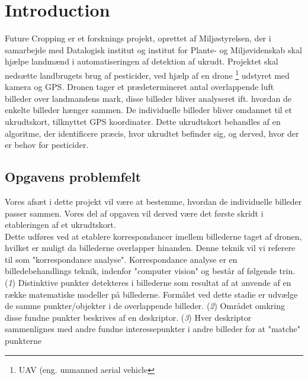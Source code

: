 \chapter{Introduction} \label{sec:intro}
Future Cropping er et forsknings projekt, oprettet af Miljøstyrelsen, der i samarbejde med Datalogisk institut og institut for Plante- og Miljøvidenskab skal hjælpe landmænd i automatiseringen af detektion af ukrudt. Projektet skal nedsætte landbrugets brug af pesticider, ved hjælp af en drone \footnote{UAV (eng. unmanned aerial vehicle} udstyret med kamera og GPS. Dronen tager et prædetermineret antal overlappende luft billeder over landmandens mark, disse billeder bliver analyseret ift. hvordan de enkelte billeder hænger sammen. De individuelle billeder bliver omdannet til et ukrudtskort, tilknyttet GPS koordinater.
Dette ukrudtskort behandles af en algoritme, der identificere præcis, hvor ukrudtet befinder sig, og derved, hvor der er behov for pesticider.
\cite{drone}
\section{Opgavens problemfelt} \label{subsec:felt}
Vores afsæt i dette projekt vil være at bestemme, hvordan de individuelle billeder passer sammen. Vores del af opgaven vil derved være det første skridt i etableringen af et ukrudtskort.  \\
Dette udføres ved at etablere korrespondancer imellem billederne taget af dronen, hvilket er muligt da billederne overlapper hinanden. Denne teknik vil vi referere til som "korrespondance analyse". Korrespondance analyse er en billedebehandlings teknik, indenfor "computer vision" og består af følgende trin. (\textit{1}) Distinktive punkter detekteres i billederne som resultat af at anvende af en række matematiske modeller på billederne. Formålet ved dette stadie er udvælge de samme punkter/objekter i de overlappende billeder. (\textit{2}) Området omkring disse fundne punkter beskrives af en deskriptor. (\textit{3}) Hver deskriptor sammenlignes med andre fundne interessepunkter i andre billeder for at "matche" punkterne

